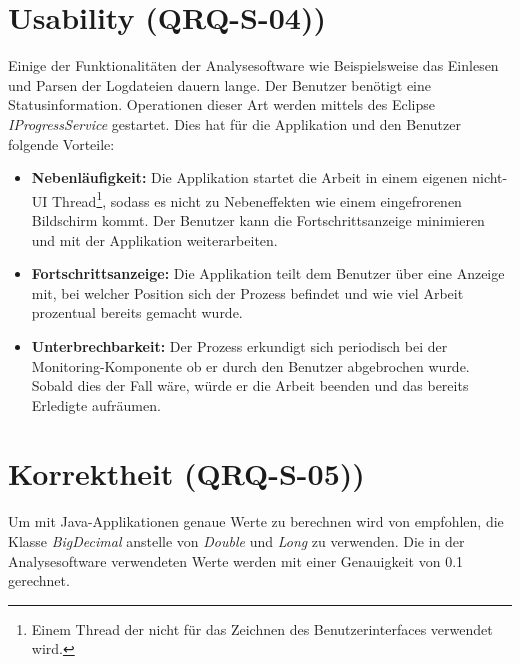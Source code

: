 \section{Usability (QRQ-S-04))}
Einige der Funktionalitäten der Analysesoftware wie Beispielsweise das Einlesen und Parsen der Logdateien dauern lange. Der Benutzer benötigt eine Statusinformation. Operationen dieser Art werden mittels des Eclipse \textit{IProgressService} gestartet. Dies hat für die Applikation und den Benutzer folgende Vorteile:
\begin{itemize}
	\item \textbf{Nebenläufigkeit:} Die Applikation startet die Arbeit in einem eigenen nicht-UI Thread\footnote{Einem Thread der nicht für das Zeichnen des Benutzerinterfaces verwendet wird.}, sodass es nicht zu Nebeneffekten wie einem eingefrorenen Bildschirm kommt. Der Benutzer kann die Fortschrittsanzeige minimieren und mit der Applikation weiterarbeiten.
	\item \textbf{Fortschrittsanzeige: } Die Applikation teilt dem Benutzer über eine Anzeige mit, bei welcher Position sich der Prozess befindet und wie viel Arbeit prozentual bereits gemacht wurde.
	\item \textbf{Unterbrechbarkeit: } Der Prozess erkundigt sich periodisch bei der Monitoring-Komponente ob er durch den Benutzer abgebrochen wurde. Sobald dies der Fall wäre, würde er die Arbeit beenden und das bereits Erledigte aufräumen.
\end{itemize}


\section{Korrektheit (QRQ-S-05))}
Um mit Java-Applikationen genaue Werte zu berechnen wird von \cite{bloch2008effective} empfohlen, die Klasse \textit{BigDecimal} anstelle von \textit{Double} und \textit{Long} zu verwenden. Die in der Analysesoftware verwendeten Werte werden mit einer Genauigkeit von 0.1 gerechnet.
